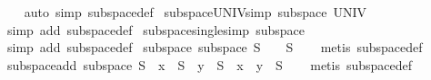 \begin{isabellebody}
%
\isadelimproof
\ \ %
\endisadelimproof
%
\isatagproof
{}\isamarkupfalse%
\ {\isacharparenleft}{\kern0pt}auto\ simp{\isacharcolon}{\kern0pt}\ subspace{\isacharunderscore}{\kern0pt}def{\isacharparenright}{\kern0pt}%
\endisatagproof
{\isafoldproof}%
%
\isadelimproof
\isanewline
%
\endisadelimproof
\isanewline
{}\isamarkupfalse%
\ subspace{\isacharunderscore}{\kern0pt}UNIV{\isacharbrackleft}{\kern0pt}simp{\isacharbrackright}{\kern0pt}{\isacharcolon}{\kern0pt}\ {\isachardoublequoteopen}subspace\ UNIV{\isachardoublequoteclose}\isanewline
%
\isadelimproof
\ \ %
\endisadelimproof
%
\isatagproof
{}\isamarkupfalse%
\ {\isacharparenleft}{\kern0pt}simp\ add{\isacharcolon}{\kern0pt}\ subspace{\isacharunderscore}{\kern0pt}def{\isacharparenright}{\kern0pt}%
\endisatagproof
{\isafoldproof}%
%
\isadelimproof
\isanewline
%
\endisadelimproof
\isanewline
{}\isamarkupfalse%
\ subspace{\isacharunderscore}{\kern0pt}single{\isacharunderscore}{\kern0pt}{}{\isacharbrackleft}{\kern0pt}simp{\isacharbrackright}{\kern0pt}{\isacharcolon}{\kern0pt}\ {\isachardoublequoteopen}subspace\ {\isacharbraceleft}{\kern0pt}{}{\isacharbraceright}{\kern0pt}{\isachardoublequoteclose}\isanewline
%
\isadelimproof
\ \ %
\endisadelimproof
%
\isatagproof
{}\isamarkupfalse%
\ {\isacharparenleft}{\kern0pt}simp\ add{\isacharcolon}{\kern0pt}\ subspace{\isacharunderscore}{\kern0pt}def{\isacharparenright}{\kern0pt}%
\endisatagproof
{\isafoldproof}%
%
\isadelimproof
\isanewline
%
\endisadelimproof
\isanewline
{}\isamarkupfalse%
\ subspace{\isacharunderscore}{\kern0pt}{}{\isacharcolon}{\kern0pt}\ {\isachardoublequoteopen}subspace\ S\ {\isasymLongrightarrow}\ {}\ {\isasymin}\ S{\isachardoublequoteclose}\isanewline
%
\isadelimproof
\ \ %
\endisadelimproof
%
\isatagproof
{}\isamarkupfalse%
\ {\isacharparenleft}{\kern0pt}metis\ subspace{\isacharunderscore}{\kern0pt}def{\isacharparenright}{\kern0pt}%
\endisatagproof
{\isafoldproof}%
%
\isadelimproof
\isanewline
%
\endisadelimproof
\isanewline
{}\isamarkupfalse%
\ subspace{\isacharunderscore}{\kern0pt}add{\isacharcolon}{\kern0pt}\ {\isachardoublequoteopen}subspace\ S\ {\isasymLongrightarrow}\ x\ {\isasymin}\ S\ {\isasymLongrightarrow}\ y\ {\isasymin}\ S\ {\isasymLongrightarrow}\ x\ {\isacharplus}{\kern0pt}\ y\ {\isasymin}\ S{\isachardoublequoteclose}\isanewline
%
\isadelimproof
\ \ %
\endisadelimproof
%
\isatagproof
{}\isamarkupfalse%
\ {\isacharparenleft}{\kern0pt}metis\ subspace{\isacharunderscore}{\kern0pt}def{\isacharparenright}{\kern0pt}%

\end{isabellebody}
